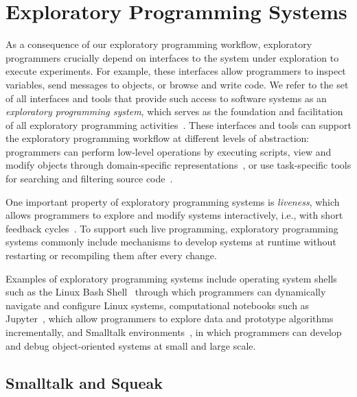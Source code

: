 
\section{Exploratory Programming Systems}
\label{sec:background/expsys}

As a consequence of our exploratory programming workflow, exploratory programmers crucially depend on interfaces to the system under exploration to execute experiments.
For example, these interfaces allow programmers to inspect variables, send messages to objects, or browse and write code.
We refer to the set of all interfaces and tools that provide such access to software systems as an \emph{exploratory programming system}, which serves as the foundation and facilitation of all exploratory programming activities~\cite{sandberg1988smalltalk,kery2017exploring,frolich2021generic,taeumel2022pattern}.
These interfaces and tools can support the exploratory programming workflow at different levels of abstraction:
programmers can perform low-level operations by executing scripts, view and modify objects through domain-specific representations~\cite{chis2015moldable}, or use task-specific tools for searching and filtering source code~\cite{taeumel2021toward}.

One important property of exploratory programming systems is \emph{liveness}, which allows programmers to explore and modify systems interactively, i.e., with short feedback cycles~\cite{sean2013usable,tanimoto2013perspective,rein2018exploratory}.
To support such live programming, exploratory programming systems commonly include mechanisms to develop systems at runtime without restarting or recompiling them after every change.

Examples of exploratory programming systems include operating system shells such as the Linux Bash Shell~\cite{raymond2003art} through which programmers can dynamically navigate and configure Linux systems, computational notebooks such as Jupyter~\cite{singer2020notes}, which allow programmers to explore data and prototype algorithms incrementally, and Smalltalk environments~\cite{goldberg1983smalltalk}, in which programmers can develop and debug object-oriented systems at small and large scale.

\subsection*{Smalltalk and Squeak}
\label{sec:background/expsys/smalltalk}

